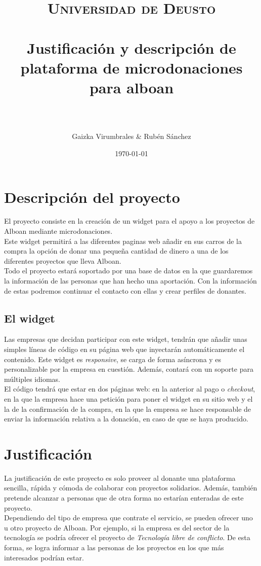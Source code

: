 \documentclass[paper=a4, fontsize=12pt]{scrartcl} %
\title{	
\normalfont \normalsize 
\textsc{Universidad de Deusto} \\ [25pt] %
\horrule{0.5pt} \\[0.4cm] %
\huge Justificación y descripción de plataforma de microdonaciones para alboan\\ %
\horrule{2pt} \\[0.5cm] %
\author{Gaizka Virumbrales \& Rubén Sánchez} %
}
\date{\normalsize\today} %
\numberwithin{equation}{section} %
\numberwithin{figure}{section} %
\numberwithin{table}{section} %
\begin{document}
\maketitle %


\section{Descripción del proyecto}

El proyecto consiste en la creación de un widget para el apoyo a los proyectos de Alboan mediante microdonaciones.\\
Este widget permitirá a las diferentes paginas web añadir en sus carros de la compra la opción de donar una pequeña cantidad de dinero a una de los diferentes proyectos que lleva Alboan.\\
Todo el proyecto estará soportado por una base de datos en la que guardaremos la información de las personas que han hecho una aportación. Con la información de estas podremos continuar el contacto con ellas y crear perfiles de donantes.


\subsection{El widget}
Las empresas que decidan participar con este widget, tendrán que añadir unas simples líneas de código en su página web que inyectarán automáticamente el contenido. Este widget es \textit{responsive}, se carga de forma asíncrona y es personalizable por la empresa en cuestión. Además, contará con un soporte para múltiples idiomas.\\
El código tendrá que estar en dos páginas web: en la anterior al pago o \textit{checkout}, en la que la empresa hace una petición para poner el widget en su sitio web y el la de la confirmación de la compra, en la que la empresa se hace responsable de enviar la información relativa a la donación, en caso de que se haya producido.

\section{Justificación}
La justificación de este proyecto es solo proveer al donante una plataforma sencilla, rápida y cómoda de colaborar con proyectos solidarios. Además, también pretende alcanzar a personas que de otra forma no estarían enteradas de este proyecto. \\
Dependiendo del tipo de empresa que contrate el servicio, se pueden ofrecer uno u otro proyecto de Alboan. Por ejemplo, si la empresa es del sector de la tecnología se podría ofrecer el proyecto de \textit{Tecnología libre de conflicto}. De esta forma, se logra informar a las personas de los proyectos en los que más interesados podrían estar.
\end{document}
